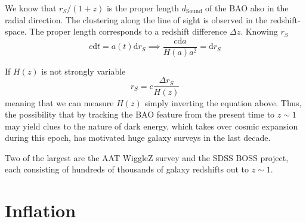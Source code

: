 We know that $r_{S}/(1+z)$ is the proper length $d_{\text{Sound}}$ of the BAO also in the radial direction. The clustering along the line of sight is observed in the redshift-space. The proper length corresponds to a redshift difference $\Delta z$. Knowing $r_{S}$
\begin{equation*}
    c\text{d}t = a(t)\text{d}r_{S} \implies \frac{c\text{d}a}{H(a)a^{2}} = \text{d}r_{S}
\end{equation*}
\par If $H(z)$ is not strongly variable
\begin{equation*}
    r_{S} = c\frac{\Delta r_{S}}{H(z)}
\end{equation*}
meaning that we can measure $H(z)$ simply inverting the equation above. Thus, the possibility that by tracking the BAO feature from the present time to $z\sim 1$ may yield clues to the nature of dark energy, which takes over cosmic expansion during this epoch, has motivated huge galaxy surveys in the last decade.
\par Two of the largest are the AAT WiggleZ survey and the SDSS BOSS project, each consisting of hundreds of thousands of galaxy redshifts out to $z\sim 1$.

\section{Inflation}

